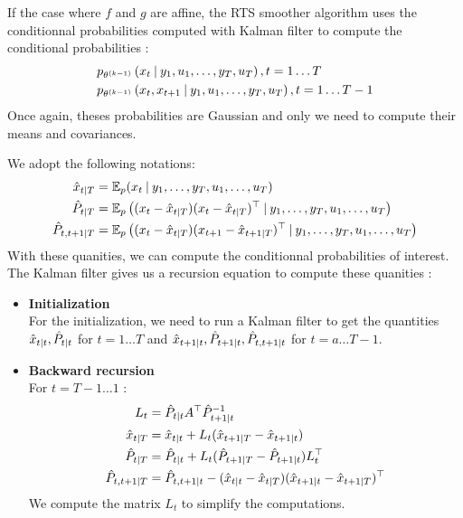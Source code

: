 If the case where $f$ and $g$ are affine, the RTS smoother algorithm uses the conditionnal probabilities computed with Kalman filter to compute the conditional probabilities :
\begin{align*}
  &p_{\theta^{(k-1)}}\left(x_t \mathbin{\vert} y_1, u_1, \ldots, y_T, u_T \right), t=1 \ldots T\\
  &p_{\theta^{(k-1)}}\left(x_t, x_{t+1} \mathbin{\vert} y_1, u_1, \ldots, y_T, u_T \right), t=1 \ldots T-1\\
\end{align*}
Once again, theses probabilities are Gaussian and only we need to compute their means and covariances.

We adopt the following notations:
\begin{align*}
  \hat{x}_{t \mathbin{\vert} T} &= \mathbb{E}_p(x_t \mathbin{\vert} y_1, \ldots , y_T, u_1, \ldots , u_T) \\
  \hat{P}_{t \mathbin{\vert} T} &= \mathbb{E}_p \left((x_t - \hat{x}_{t \mathbin{\vert} T})(x_t - \hat{x}_{t \mathbin{\vert} T})^{\top} \mathbin{\vert} y_1, \ldots , y_T, u_1, \ldots , u_T \right) \\
  \hat{P}_{t,t+1 \mathbin{\vert} T} &= \mathbb{E}_p \left((x_t - \hat{x}_{t \mathbin{\vert} T})(x_{t+1} - \hat{x}_{t+1 \mathbin{\vert} T})^{\top} \mathbin{\vert} y_1, \ldots , y_T, u_1, \ldots , u_T \right) \\
\end{align*}
With these quanities, we can compute the conditionnal probabilities of interest.
The Kalman filter gives us a recursion equation to compute these quanities :
\begin{itemize}
  \item \textbf{Initialization}\\
    For the initialization, we need to run a Kalman filter to get the quantities $\hat{x}_{t \mathbin{\vert} t}, \hat{P}_{t \mathbin{\vert} t}$ for $t=1 \ldots T$ and $\hat{x}_{t+1 \mathbin{\vert} t}, \hat{P}_{t+1 \mathbin{\vert} t}, \hat{P}_{t,t+1 \mathbin{\vert} t}$ for $t=a \ldots T-1$.
  \item \textbf{Backward recursion}\\
    For $t=T-1 \ldots 1$ :
    \begin{align*}
      L_t &= \hat{P}_{t \mathbin{\vert} t}A^{\top}\hat{P}_{t+1 \mathbin{\vert} t}^{-1}\\
      \hat{x}_{t \mathbin{\vert} T} &= \hat{x}_{t \mathbin{\vert} t} + L_t(\hat{x}_{t+1 \mathbin{\vert} T} - \hat{x}_{t+1 \mathbin{\vert} t})\\
      \hat{P}_{t \mathbin{\vert} T} &= \hat{P}_{t \mathbin{\vert} t} + L_t(\hat{P}_{t+1 \mathbin{\vert} T} - \hat{P}_{t+1 \mathbin{\vert} t})L_t^{\top}\\
      \hat{P}_{t,t+1 \mathbin{\vert} T} &= \hat{P}_{t,t+1 \mathbin{\vert} t} - (\hat{x}_{t \mathbin{\vert} t} - \hat{x}_{t \mathbin{\vert} T})(\hat{x}_{t+1 \mathbin{\vert} t} - \hat{x}_{t+1 \mathbin{\vert} T})^{\top}\\
    \end{align*}
    We compute the matrix $L_{t}$ to simplify the computations.
\end{itemize}

